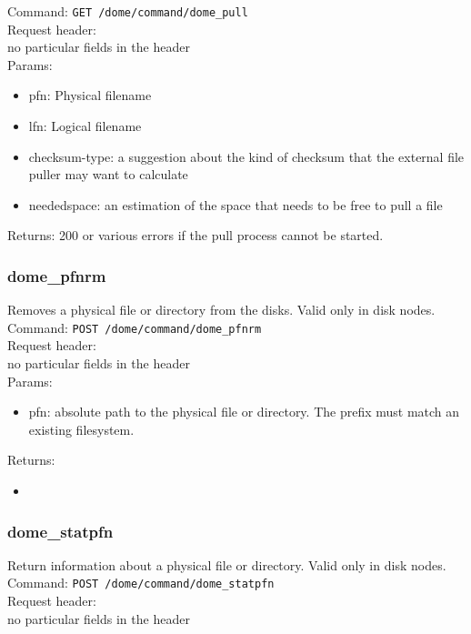 \documentclass[a4paper,10pt]{scrreprt}
\begin{document}
Command:
\lstinline"GET /dome/command/dome_pull"\\

Request header:\\
no particular fields in the header\\

Params:
\begin{itemize}
 \item pfn: Physical filename
 \item lfn: Logical filename
 \item checksum-type: a suggestion about the kind of checksum that the external file puller may want to calculate
 \item neededspace: an estimation of the space that needs to be free to pull a file
\end{itemize}

Returns: 200 or various errors if the pull process cannot be started.


\subsubsection{dome\_pfnrm}

Removes a physical file or directory from the disks. Valid only in disk nodes.\\
Command:
\lstinline"POST /dome/command/dome_pfnrm"\\

Request header:\\
no particular fields in the header\\

Params:
\begin{itemize}
 \item pfn: absolute path to the physical file or directory. The prefix must match an existing filesystem.
\end{itemize}

Returns:
\begin{itemize}
 \item
\end{itemize}














\subsubsection{dome\_statpfn}
Return information about a physical file or directory. Valid only in disk nodes.\\
Command:
\lstinline"POST /dome/command/dome_statpfn"\\
Request header:\\
 no particular fields in the header\\
\end{document}
